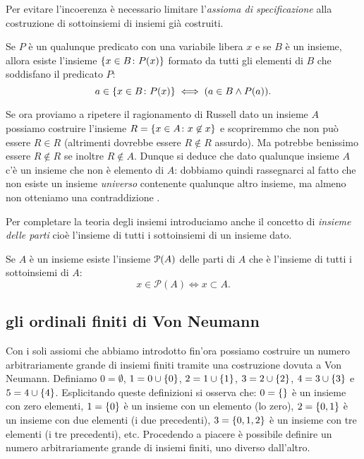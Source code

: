 Per evitare l'incoerenza è necessario limitare l'\emph{assioma di specificazione}
alla costruzione di sottoinsiemi di insiemi già costruiti.

\begin{axiom}[specificazione]
  Se $P$ è un qualunque predicato con una variabile libera $x$
  e se $B$ è un insieme, allora esiste l'insieme 
  $\ENCLOSE {x\in B\colon P(x)}$ formato 
  da tutti gli elementi di $B$ che soddisfano il predicato $P$:
\[
  a \in \ENCLOSE{x\in B\colon P(x)} \iff (a \in B \land P(a)).
\]
\end{axiom}

Se ora proviamo a ripetere il ragionamento di Russell dato un insieme $A$ 
possiamo costruire l'insieme $R=\ENCLOSE{x\in A\colon x\not \in x}$
e scopriremmo che non può essere $R\in R$ 
(altrimenti dovrebbe essere $R\not \in R$ assurdo).
Ma potrebbe benissimo essere $R\not \in R$ se inoltre $R\not \in A$.
Dunque si deduce che dato qualunque insieme $A$ c'è un insieme 
che non è elemento di $A$: dobbiamo quindi rassegnarci al fatto che non
esiste un insieme \emph{universo} contenente qualunque altro insieme,
ma almeno non otteniamo una contraddizione%
.

Per completare la teoria degli insiemi introduciamo anche il concetto di
\emph{insieme delle parti}%
%
% 
cioè l'insieme di tutti i sottoinsiemi di un insieme dato.
\begin{axiom}
\label{def:insieme_parti}%
Se $A$ è un insieme esiste l'insieme $\P(A)$ delle parti di $A$
che è l'insieme di tutti i sottoinsiemi di $A$:
\begin{equation}\label{eq:insieme_delle_parti}
  x \in \mathcal P(A) \iff x \subset A.
\end{equation}
\end{axiom}

\subsection{gli ordinali finiti di Von Neumann}

Con i soli assiomi che abbiamo introdotto fin'ora possiamo 
costruire un numero arbitrariamente grande di insiemi finiti
tramite una costruzione dovuta a Von Neumann. 
Definiamo $0=\emptyset$, $1= 0 \cup \ENCLOSE{0}$, $2=1\cup \ENCLOSE{1}$,
$3 = 2\cup \ENCLOSE{2}$, $4=3\cup\ENCLOSE{3}$ e $5=4\cup \ENCLOSE{4}$.
Esplicitando queste definizioni si osserva che:
$0 = \ENCLOSE{}$ è un insieme con zero elementi, 
$1= \ENCLOSE{0}$ è un insieme con un elemento (lo zero),
$2= \ENCLOSE{0,1}$ è un insieme con due elementi (i due precedenti), 
$3 = \ENCLOSE{0,1,2}$ è un insieme con tre elementi (i tre precedenti),
etc.
Procedendo a piacere è possibile definire un numero arbitrariamente 
grande di insiemi finiti, uno diverso dall'altro.

